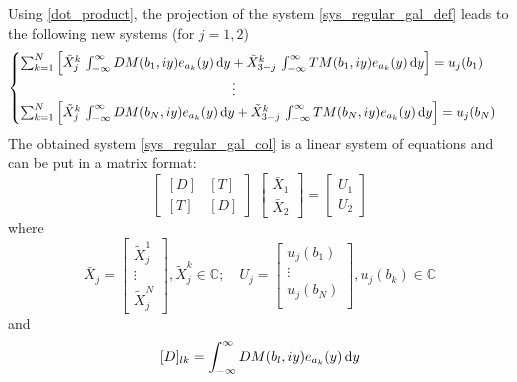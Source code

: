 Using \eqref{dot_product}, the projection of the system \eqref{sys_regular_gal_def} leads to the following new systems (for $j=1,2$)
\begin{equation}
\label{sys_regular_gal_col}
\begin{cases}
\sum_{k=1}^N \left[ \tilde{X}_j^k \, \int_{-\infty}^\infty DM(b_1,iy) e_{a_k}(y) \, {\rm d} y + \tilde{X}_{3-j}^k \, \int_{-\infty}^\infty TM(b_1,iy) e_{a_k}(y) \, {\rm d} y \right] = u_j(b_1) \\
 \qquad \qquad \qquad \qquad \qquad \qquad \qquad \qquad \vdots \\
\sum_{k=1}^N \left[ \tilde{X}_j^k \, \int_{-\infty}^\infty DM(b_N,iy) e_{a_k}(y) \, {\rm d} y + \tilde{X}_{3-j}^k \, \int_{-\infty}^\infty TM(b_N,iy) e_{a_k}(y) \, {\rm d} y \right] = u_j(b_N)
\end{cases}
\end{equation}
The obtained system \eqref{sys_regular_gal_col} is a linear system of equations and can be put in a matrix format:
\begin{equation}
\label{Syst_lineaire}
\left[
\begin{matrix}
[D] & [T]\\
[T] & [D]
\end{matrix}
\right]
\;
\left[
\begin{matrix}
\bar{X}_1\\
\bar{X}_2
\end{matrix}
\right] = 
\left[
\begin{matrix}
U_1\\
U_2
\end{matrix}
\right]
\end{equation}
where
\begin{equation}
\bar{X}_j = 
\left[
\begin{matrix}
\tilde{X}_j^1 \\
\vdots \\
\tilde{X}_j^N
\end{matrix}
\right], \tilde{X}_j^k \in \mathbb{C}; \quad
U_j = 
\left[
\begin{matrix}
u_j(b_1)\\
\vdots\\
u_j(b_N)\\
\end{matrix}
\right], u_j(b_k) \in \mathbb{C}
\end{equation} 
and 
\begin{equation}
\label{D_matrix}
[D]_{lk} = \int_{-\infty}^\infty DM(b_l,iy) e_{a_k}(y) \, {\rm d} y
\end{equation}
